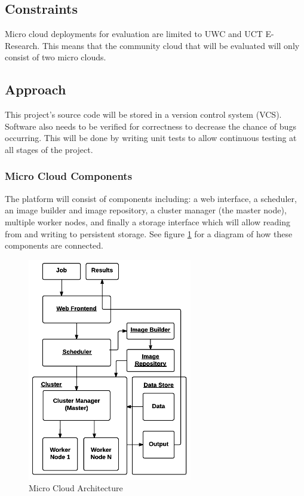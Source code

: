 \documentclass{sig-alternate-05-2015}
\begin{document}
\subsection{Constraints}
Micro cloud deployments for evaluation are limited to UWC and UCT E-Research. This means that the community cloud that will be evaluated will only consist of two micro clouds.

\subsection{Approach}


This project's source code will be stored in a version control system (VCS). Software also needs to be verified for correctness to decrease the chance of bugs occurring. This will be done by writing unit tests to allow continuous testing at all stages of the project.


\subsubsection{Micro Cloud Components}
The platform will consist of components including: a web interface, a scheduler, an image builder and image repository, a cluster manager (the master node), multiple worker nodes, and finally a storage interface which will allow reading from and writing to persistent storage. See figure \ref{fig:architecture} for a diagram of how these components are connected.

\begin{figure}
\centering
\includegraphics[scale=0.8]{img/microcloud_architecture}
\caption{Micro Cloud Architecture}
\label{fig:architecture}
\end{figure}
\end{document}
